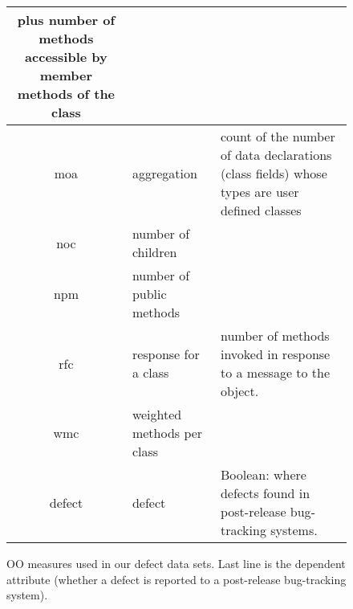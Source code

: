 \documentclass{sig-alternate}
\begin{document}
\begin{figure*}[htbp!]
\begin{center}
{\begin{tabular}{c|l|p{4.7in}}
				plus number of methods accessible by member methods of the
				class\\\hline
				moa &  aggregation &  count of the number of data declarations (class
				fields) whose types are user defined classes\\\hline
				noc &  number of children &\\\hline
				npm & number of public methods & \\\hline
				rfc & response for a class &number of  methods invoked in response to
				a message to the object.\\\hline
				wmc & weighted methods per class &\\\hline
				\rowcolor{lightgray}
				defect & defect & Boolean: where defects found in post-release bug-tracking systems.
			\end{tabular}
		}
	\end{center}
	\caption{OO measures used in our defect data sets.  Last line is
		the dependent attribute (whether a defect is reported to  a
		post-release bug-tracking system).}\label{fig:ck}
\end{figure*}
\end{document}
